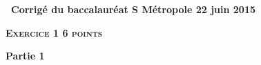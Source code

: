 \documentclass[12pt]{article}
\begin{document}
\setlength\parindent{0mm}
\renewcommand \footrulewidth{.2pt}
\pagestyle{fancy}
\thispagestyle{empty}
\begin{center} {\large{\textbf{\decofourleft~Corrigé du baccalauréat S  Métropole 22 juin 2015~\decofourright
}}} 

\end{center}

\vspace{0,5cm}

\textbf{\textsc{Exercice 1 \hfill 6 points}}

%
%
%

\textbf{Partie 1}

\medskip
\end{document}
